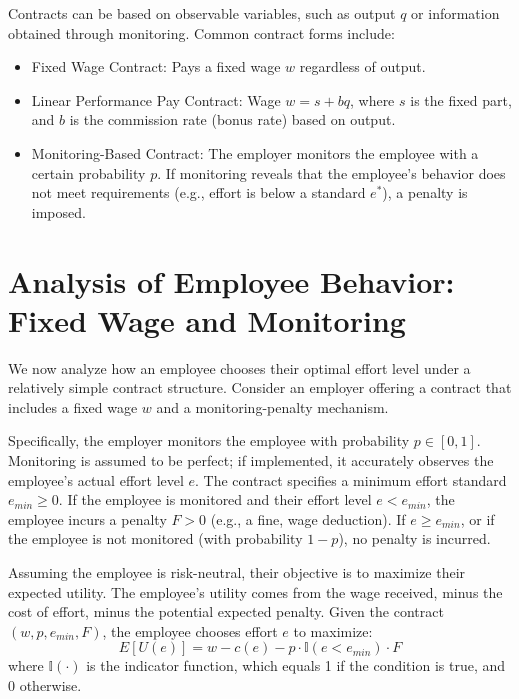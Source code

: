 Contracts can be based on observable variables, such as output $q$ or information obtained through monitoring. Common contract forms include:
\begin{itemize}
    \item Fixed Wage Contract: Pays a fixed wage $w$ regardless of output.
    \item Linear Performance Pay Contract: Wage $w = s + bq$, where $s$ is the fixed part, and $b$ is the commission rate (bonus rate) based on output.
    \item Monitoring-Based Contract: The employer monitors the employee with a certain probability $p$. If monitoring reveals that the employee's behavior does not meet requirements (e.g., effort is below a standard $e^*$), a penalty is imposed.
\end{itemize}

\section{Analysis of Employee Behavior: Fixed Wage and Monitoring}
\label{sec:agent_behavior_monitor}

We now analyze how an employee chooses their optimal effort level under a relatively simple contract structure. Consider an employer offering a contract that includes a fixed wage $w$ and a monitoring-penalty mechanism.

Specifically, the employer monitors the employee with probability $p \in [0, 1]$. Monitoring is assumed to be perfect; if implemented, it accurately observes the employee's actual effort level $e$. The contract specifies a minimum effort standard $e_{min} \ge 0$. If the employee is monitored and their effort level $e < e_{min}$, the employee incurs a penalty $F > 0$ (e.g., a fine, wage deduction). If $e \ge e_{min}$, or if the employee is not monitored (with probability $1-p$), no penalty is incurred.

Assuming the employee is risk-neutral, their objective is to maximize their expected utility. The employee's utility comes from the wage received, minus the cost of effort, minus the potential expected penalty. Given the contract $(w, p, e_{min}, F)$, the employee chooses effort $e$ to maximize:
\begin{equation}
E[U(e)] = w - c(e) - p \cdot \mathbb{I}(e < e_{min}) \cdot F
\end{equation}
where $\mathbb{I}(\cdot)$ is the indicator function, which equals 1 if the condition is true, and 0 otherwise.

